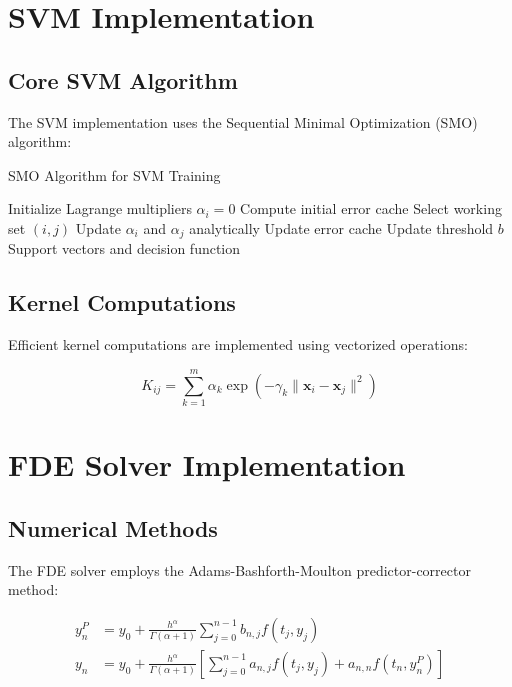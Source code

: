 \documentclass[12pt,a4paper]{report}
\begin{document}
\section{SVM Implementation}

\subsection{Core SVM Algorithm}

The SVM implementation uses the Sequential Minimal Optimization (SMO) algorithm:

\begin{algorithm}[H]
\caption{SMO Algorithm for SVM Training}
\begin{algorithmic}[1]
\STATE Initialize Lagrange multipliers $\alpha_i = 0$
\STATE Compute initial error cache
    \STATE Select working set $(i, j)$
    \STATE Update $\alpha_i$ and $\alpha_j$ analytically
    \STATE Update error cache
    \STATE Update threshold $b$
\ENDWHILE
\RETURN Support vectors and decision function
\end{algorithmic}
\end{algorithm}

\subsection{Kernel Computations}

Efficient kernel computations are implemented using vectorized operations:

\begin{equation}
K_{ij} = \sum_{k=1}^{m} \alpha_k \exp\left(-\gamma_k \|\mathbf{x}_i - \mathbf{x}_j\|^2\right)
\end{equation}

\section{FDE Solver Implementation}

\subsection{Numerical Methods}

The FDE solver employs the Adams-Bashforth-Moulton predictor-corrector method:

\begin{align}
y_n^P &= y_0 + \frac{h^\alpha}{\Gamma(\alpha+1)} \sum_{j=0}^{n-1} b_{n,j} f(t_j, y_j) \\
y_n &= y_0 + \frac{h^\alpha}{\Gamma(\alpha+1)} \left[ \sum_{j=0}^{n-1} a_{n,j} f(t_j, y_j) + a_{n,n} f(t_n, y_n^P) \right]
\end{align}
\end{document}
